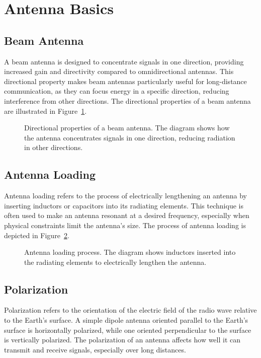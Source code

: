 \section{Antenna Basics}
\label{section:antenna_basics}

\subsection*{Beam Antenna}
A beam antenna is designed to concentrate signals in one direction, providing increased gain and directivity compared to omnidirectional antennas. This directional property makes beam antennas particularly useful for long-distance communication, as they can focus energy in a specific direction, reducing interference from other directions. The directional properties of a beam antenna are illustrated in Figure~\ref{fig:beam_antenna}.

\begin{figure}[h!]
    \centering
    \caption{Directional properties of a beam antenna. The diagram shows how the antenna concentrates signals in one direction, reducing radiation in other directions.}
    \label{fig:beam_antenna}
\end{figure}

\subsection*{Antenna Loading}
Antenna loading refers to the process of electrically lengthening an antenna by inserting inductors or capacitors into its radiating elements. This technique is often used to make an antenna resonant at a desired frequency, especially when physical constraints limit the antenna's size. The process of antenna loading is depicted in Figure~\ref{fig:antenna_loading}.

\begin{figure}[h!]
    \centering
    \caption{Antenna loading process. The diagram shows inductors inserted into the radiating elements to electrically lengthen the antenna.}
    \label{fig:antenna_loading}
\end{figure}

\subsection*{Polarization}
Polarization refers to the orientation of the electric field of the radio wave relative to the Earth's surface. A simple dipole antenna oriented parallel to the Earth's surface is horizontally polarized, while one oriented perpendicular to the surface is vertically polarized. The polarization of an antenna affects how well it can transmit and receive signals, especially over long distances.

